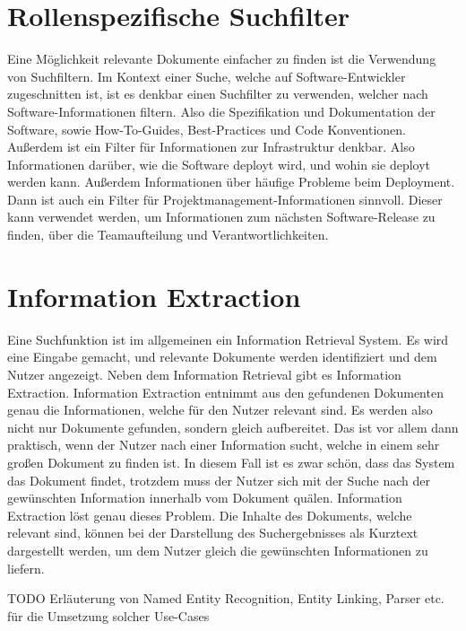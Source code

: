 \section{Rollenspezifische Suchfilter}
\label{chap:rollenspezifische-suchfilter}
Eine Möglichkeit relevante Dokumente einfacher zu finden ist die Verwendung von Suchfiltern.
Im Kontext einer Suche, welche auf Software-Entwickler zugeschnitten ist, ist es denkbar einen Suchfilter zu verwenden, welcher nach Software-Informationen filtern.
Also die Spezifikation und Dokumentation der Software, sowie How-To-Guides, Best-Practices und Code Konventionen.
Außerdem ist ein Filter für Informationen zur Infrastruktur denkbar. Also Informationen darüber, wie die Software deployt wird, und wohin sie deployt werden kann.
Außerdem Informationen über häufige Probleme beim Deployment.
Dann ist auch ein Filter für Projektmanagement-Informationen sinnvoll.
Dieser kann verwendet werden, um Informationen zum nächsten Software-Release zu finden, über die Teamaufteilung und Verantwortlichkeiten.

\section{Information Extraction}
Eine Suchfunktion ist im allgemeinen ein Information Retrieval System.
Es wird eine Eingabe gemacht, und relevante Dokumente werden identifiziert und dem Nutzer angezeigt.
Neben dem Information Retrieval gibt es Information Extraction.
Information Extraction entnimmt aus den gefundenen Dokumenten genau die Informationen, welche für den Nutzer relevant sind.
Es werden also nicht nur Dokumente gefunden, sondern gleich aufbereitet.
Das ist vor allem dann praktisch, wenn der Nutzer nach einer Information sucht, welche in einem sehr großen Dokument zu finden ist.
In diesem Fall ist es zwar schön, dass das System das Dokument findet, trotzdem muss der Nutzer sich mit der Suche nach der gewünschten Information innerhalb vom Dokument quälen.
Information Extraction löst genau dieses Problem.
Die Inhalte des Dokuments, welche relevant sind, können bei der Darstellung des Suchergebnisses als Kurztext dargestellt werden, um dem Nutzer gleich die gewünschten Informationen zu liefern.

TODO Erläuterung von Named Entity Recognition, Entity Linking, Parser etc. für die Umsetzung solcher Use-Cases
